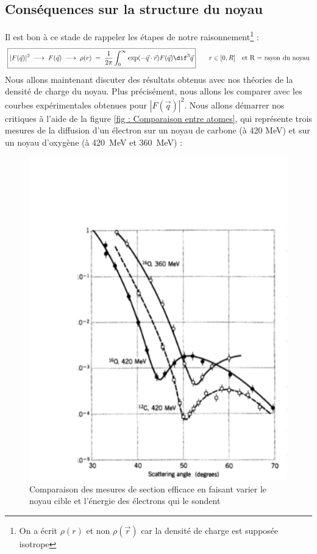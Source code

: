     \subsection{Conséquences sur la structure du noyau}


Il est bon à ce stade de rappeler les étapes de notre raisonnement\footnote{On a écrit $\rho(r)$ et non $\rho(\vec{r})$ car la densité de charge est supposée isotrope} : 
\[
\boxed{
    |F(\vec{q})|^2 \; \longrightarrow \; F(\vec{q}) \; \longrightarrow \; \rho(r) \eq \dfrac{1}{2\pi} \int_0^{\infty} \exp(-\vec{q}\cdot \vec{r})
    F(\vec{q}) \dif^3\vec{q}
}
    \qquad r \in [0,R] \quad \text{et R = rayon du noyau}
\]
Nous allons maintenant discuter des résultats obtenus avec nos théories de la densité de charge du noyau. Plus précisément, nous allons les comparer avec les courbes expérimentales obtenues pour $|F(\vec{q})|^2$. Nous allons démarrer nos critiques à l'aide de la figure \eqref{fig : Comparaison entre atomes}, qui représente trois mesures de la diffusion d'un électron sur un noyau de carbone (à 420 {MeV}) et sur un noyau d'oxygène (à \SI{420}{MeV} et \SI{360}{MeV}) :
\begin{figure}[H]
    \centering
    \includegraphics[scale=0.80]{Images4/ComparaisonAtomes.PNG}
    \caption{Comparaison des mesures de section efficace en faisant varier le noyau cible et l'énergie des électrons qui le sondent}
    \label{fig : Comparaison entre atomes}
\end{figure}

